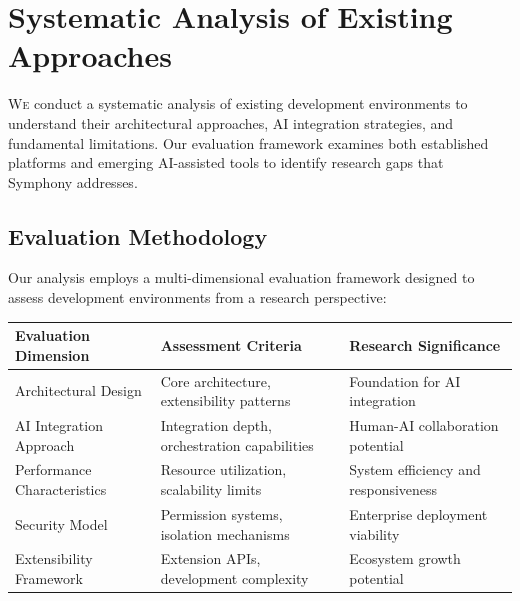 
\section{Systematic Analysis of Existing Approaches}
\label{sec:systematic-analysis}

\lettrine{W}{e} conduct a systematic analysis of existing development environments to understand their architectural approaches, AI integration strategies, and fundamental limitations. Our evaluation framework examines both established platforms and emerging AI-assisted tools to identify research gaps that Symphony addresses.

\subsection{Evaluation Methodology}
\label{subsec:evaluation-methodology}

Our analysis employs a multi-dimensional evaluation framework designed to assess development environments from a research perspective:

\begin{center}
\begin{tabular}{@{}lll@{}}
\toprule
\textbf{Evaluation Dimension} & \textbf{Assessment Criteria} & \textbf{Research Significance} \\
\midrule
Architectural Design & Core architecture, extensibility patterns & Foundation for AI integration \\
AI Integration Approach & Integration depth, orchestration capabilities & Human-AI collaboration potential \\
Performance Characteristics & Resource utilization, scalability limits & System efficiency and responsiveness \\
Security Model & Permission systems, isolation mechanisms & Enterprise deployment viability \\
Extensibility Framework & Extension APIs, development complexity & Ecosystem growth potential \\
\bottomrule
\end{tabular}
\label{tab:evaluation-framework}
\end{center}

